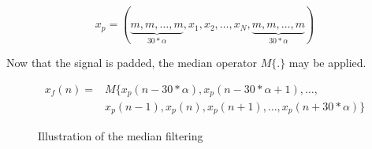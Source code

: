 \documentclass[a4paper,12pt]{article}
\begin{document}
\begin{equation}
\label{padding}
x_p = (\underbrace{m, m, \ldots, m}_{30 * \alpha}, x_1, x_2, \ldots, x_N, \underbrace{m, m, \ldots, m}_{30 * \alpha})
\end{equation}

Now that the signal is padded, the median operator $M\{.\}$ may be applied.

\begin{equation}
\begin{split}
x_f(n) = & M\{x_p(n - 30 * \alpha), x_p(n - 30 * \alpha + 1), \ldots,\\
         & x_p(n - 1), x_p(n), x_p(n+1), \ldots, x_p(n + 30 * \alpha)\}
\end{split}
\end{equation}

\begin{figure}[H]
\centering
{}
\caption{Illustration of the median filtering}
\end{figure}
\end{document}
